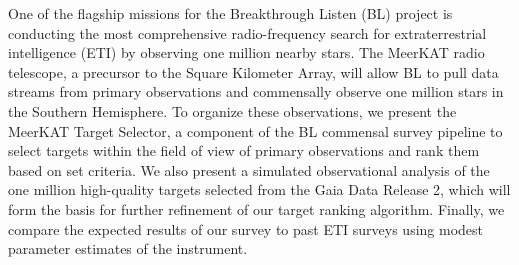 One of the flagship missions for the Breakthrough Listen (BL) project is conducting the most comprehensive radio-frequency search for extraterrestrial intelligence (ETI) by observing one million nearby stars. The MeerKAT radio telescope, a precursor to the Square Kilometer Array, will allow BL to pull data streams from primary observations and commensally observe one million stars in the Southern Hemisphere. To organize these observations, we present the MeerKAT Target Selector, a component of the BL commensal survey pipeline to select targets within the field of view of primary observations and rank them based on set criteria. We also present a simulated observational analysis of the one million high-quality targets selected from the Gaia Data Release 2, which will form the basis for further refinement of our target ranking algorithm. Finally, we compare the expected results of our survey to past ETI surveys using modest parameter estimates of the instrument.
